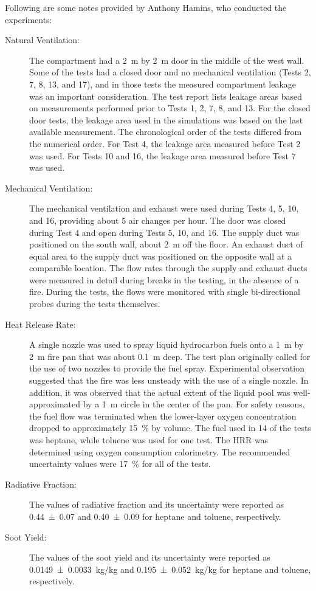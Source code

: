 Following are some notes provided by Anthony Hamins, who conducted the experiments:
\begin{description}
\item[Natural Ventilation:] The compartment had a 2~m by 2~m door in the middle of the west wall. Some of the tests had a closed door and no mechanical
ventilation (Tests 2, 7, 8, 13, and 17), and in those tests the measured compartment leakage was an important consideration. The test report lists leakage
areas based on measurements performed prior to Tests 1, 2, 7, 8, and 13. For the closed door tests, the leakage area used in the simulations was
based on the last available measurement. The chronological order of the tests differed from the numerical order.
For Test 4, the leakage area measured before Test 2 was used. For Tests 10 and 16, the leakage area
measured before Test 7 was used.
\item[Mechanical Ventilation:] The mechanical ventilation and exhaust were used during Tests 4, 5, 10, and 16, providing about 5 air changes per hour. The
door was closed during Test 4 and open during Tests 5, 10, and 16. The supply duct was positioned on the south wall, about 2~m off the floor. An
exhaust duct of equal area to the supply duct was positioned on the opposite wall at a comparable location. The flow rates through the supply and
exhaust ducts were measured in detail during breaks in the testing, in the absence of a fire. During the tests, the flows were monitored with single
bi-directional probes during the tests themselves.
\item[Heat Release Rate:] A single nozzle was used to spray liquid hydrocarbon fuels onto a 1~m by 2~m fire pan that was about 0.1~m deep. The test plan
originally called for the use of two nozzles to provide the fuel spray. Experimental observation suggested that the fire was less unsteady with the
use of a single nozzle. In addition, it was observed that the actual extent of the liquid pool was well-approximated by a 1~m circle in the
center of the pan. For safety reasons, the fuel flow was terminated when the lower-layer oxygen concentration
dropped to approximately 15~\% by volume.
The fuel used in 14 of the tests was heptane, while toluene was used for one test. The HRR was
determined using oxygen consumption calorimetry. The recommended uncertainty values
were 17~\% for all of the tests.
\item[Radiative Fraction:]  The values of radiative fraction and its uncertainty were reported as
\num{0.44 \pm 0.07} and \num{0.40 \pm 0.09} for heptane and toluene, respectively.
\item[Soot Yield:]  The values of the soot yield and its uncertainty were reported as \SI{0.0149 \pm 0.0033}{kg/kg}
and \SI{0.195 \pm 0.052}{kg/kg} for heptane and toluene, respectively.
\end{description}

